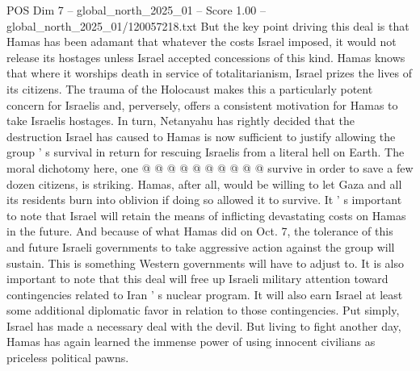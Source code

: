 \begin{textsample}{POS Dim 7 – global\_north\_2025\_01 – Score 1.00 – global\_north\_2025\_01/120057218.txt}
But the key point driving this deal is that Hamas has been adamant that whatever the costs Israel imposed, it would not release its hostages unless Israel accepted concessions of this kind.
Hamas knows that where it worships death in service of totalitarianism, Israel prizes the lives of its citizens.
The trauma of the Holocaust makes this a particularly potent concern for Israelis and, perversely, offers a consistent motivation for Hamas to take Israelis hostages.
In turn, Netanyahu has rightly decided that the destruction Israel has caused to Hamas is now sufficient to justify allowing the group ' s survival in return for rescuing Israelis from a literal hell on Earth.
The moral dichotomy here, one @ @ @ @ @ @ @ @ @ @ survive in order to save a few dozen citizens, is striking.
Hamas, after all, would be willing to let Gaza and all its residents burn into oblivion if doing so allowed it to survive.
It ' s important to note that Israel will retain the means of inflicting devastating costs on Hamas in the future.
And because of what Hamas did on Oct. 7, the tolerance of this and future Israeli governments to take aggressive action against the group will sustain.
This is something Western governments will have to adjust to.
It is also important to note that this deal will free up Israeli military attention toward contingencies related to Iran ' s nuclear program.
It will also earn Israel at least some additional diplomatic favor in relation to those contingencies.
Put simply, Israel has made a necessary deal with the devil.
But living to fight another day, Hamas has again learned the immense power of using innocent civilians as priceless political pawns.

\end{textsample}
